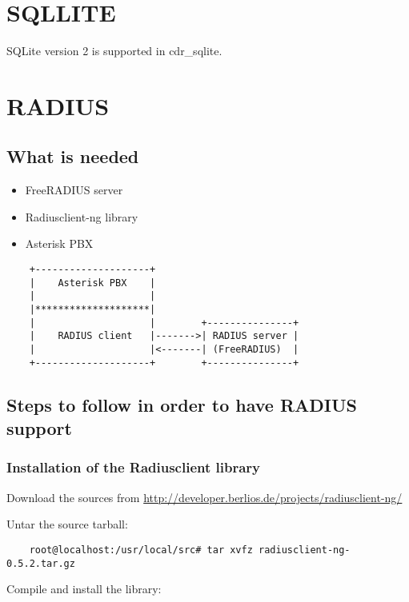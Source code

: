 \section{SQLLITE}

SQLite version 2 is supported in cdr\_sqlite.

\section{RADIUS}

\subsection{What is needed}

\begin{itemize}
	\item FreeRADIUS server
	\item Radiusclient-ng library
	\item Asterisk PBX
\end{itemize}

\begin{verbatim}
	+--------------------+
	|    Asterisk PBX    |
	|                    |
	|********************|
	|                    |        +---------------+
	|    RADIUS client   |------->| RADIUS server |
	|                    |<-------| (FreeRADIUS)  |
	+--------------------+        +---------------+
\end{verbatim}



\subsection{Steps to follow in order to have RADIUS support}

\subsubsection{Installation of the Radiusclient library}

	Download the sources from	
	\url{http://developer.berlios.de/projects/radiusclient-ng/}
		
	Untar the source tarball:

\begin{verbatim}
	root@localhost:/usr/local/src# tar xvfz radiusclient-ng-0.5.2.tar.gz
\end{verbatim}

	Compile and install the library:

